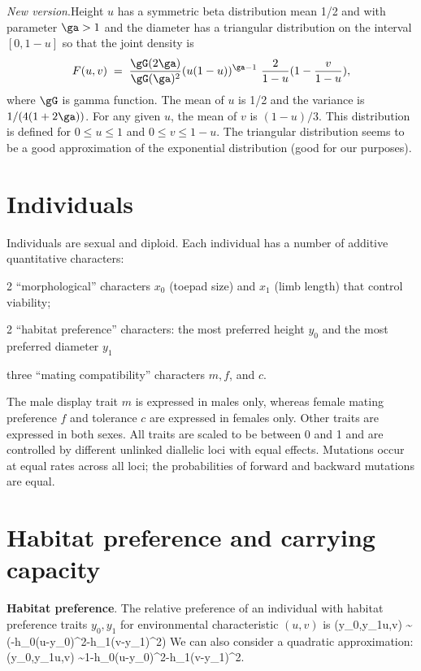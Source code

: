 \documentclass{article}
\begin{document}
{\em New version}.\quad Height $u$ has a symmetric beta distribution mean 1/2
and with parameter
$\ga>1$ and the diameter has a triangular distribution on the interval $[0,1-u]$
so that the joint density is 
\begin{equation} \label{beta}
F(u,v) \; = \;
\frac{\gG(2\ga)}{\gG(\ga)^2} (u(1-u))^{\ga-1}\ \frac{2}{1-u}(1-\frac{v}{1-u}),
\end{equation}
where $\gG$ is gamma function. The mean of $u$ is 1/2 and the variance is $1/(4(1+2\ga))$.
For any given $u$, the mean of $v$ is $(1-u)/3$.
This distribution is defined for $0 \leq u \leq 1$ and $0 \leq v \leq 1-u$.
The triangular distribution seems to be a good approximation of the exponential
distribution (good for our purposes).

\section{Individuals}

Individuals are sexual and diploid. Each individual has a number of
additive quantitative characters: \bi
\item 2 ``morphological'' characters $x_0$ (toepad size) and $x_1$
  (limb length) that control viability;
\item 2 ``habitat preference'' characters: the most preferred height
  $y_0$ and the most preferred diameter $y_1$
\item three ``mating compatibility'' characters $m, f$, and $c$.
\ei

The male display trait $m$ is expressed in males only, whereas female
mating preference $f$ and tolerance $c$ are expressed in females
only. Other traits are expressed in both sexes.  All traits are scaled
to be between 0 and 1 and are controlled by different unlinked
diallelic loci with equal effects. Mutations occur at equal rates
across all loci; the probabilities of forward and backward mutations
are equal.


\newpage
\section{Habitat preference and carrying capacity}

{\bf Habitat preference}.\quad
The relative preference of an individual with habitat preference
traits $y_0,y_1$ for environmental characteristic $(u,v)$ is 
	\be 
	\Xi(y_0,y_1\mid u,v) \sim \exp(-h_0(u-y_0)^2-h_1(v-y_1)^2)
	\ee
We can also consider a quadratic approximation:
	\be \label{quad}
	\Xi(y_0,y_1\mid u,v) \sim 1-h_0(u-y_0)^2-h_1(v-y_1)^2.
	\ee
\end{document}
